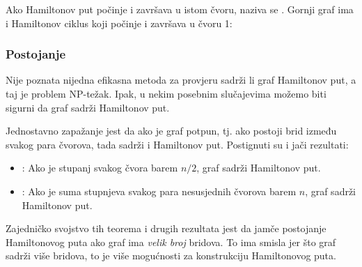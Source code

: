 Ako Hamiltonov put počinje i završava u istom čvoru,
naziva se .
Gornji graf ima i Hamiltonov ciklus
koji počinje i završava u čvoru 1:
\begin{center}
\end{center}

\subsubsection{Postojanje}

Nije poznata nijedna efikasna metoda za provjeru sadrži li graf
Hamiltonov put, a taj je problem NP-težak.
Ipak, u nekim posebnim slučajevima možemo biti sigurni
da graf sadrži Hamiltonov put.

Jednostavno zapažanje jest da ako je graf potpun,
tj. ako postoji brid između svakog para čvorova,
tada sadrži i Hamiltonov put.
Postignuti su i jači rezultati:

\begin{itemize}
\item
{}
: %
Ako je stupanj svakog čvora barem $n/2$,
graf sadrži Hamiltonov put.
\item
{}
: %
Ako je suma stupnjeva svakog para nesusjednih čvorova
barem $n$,
graf sadrži Hamiltonov put.
\end{itemize}

Zajedničko svojstvo tih teorema i drugih rezultata jest
da jamče postojanje Hamiltonovog puta
ako graf ima \emph{velik broj} bridova.
To ima smisla jer što graf sadrži više bridova,
to je više mogućnosti za konstrukciju Hamiltonovog puta.

